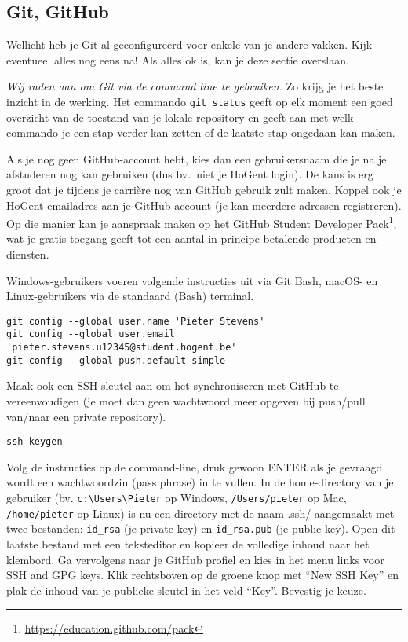 \subsection{Git, GitHub}

Wellicht heb je Git al geconfigureerd voor enkele van je andere vakken. Kijk eventueel alles nog eens na! Als alles ok is, kan je deze sectie overslaan.

\emph{Wij raden aan om Git via de command line te gebruiken.} Zo krijg je het beste inzicht in de werking. Het commando \texttt{git status} geeft op elk moment een goed overzicht van de toestand van je lokale repository en geeft aan met welk commando je een stap verder kan zetten of de laatste stap ongedaan kan maken.

Als je nog geen GitHub-account hebt, kies dan een gebruikersnaam die je na je afstuderen nog kan gebruiken (dus bv.~niet je HoGent login). De kans is erg groot dat je tijdens je carrière nog van GitHub gebruik zult maken. Koppel ook je HoGent-emailadres aan je GitHub account (je kan meerdere adressen registreren). Op die manier kan je aanspraak maken op het GitHub Student Developer Pack\footnote{\url{https://education.github.com/pack}}, wat je gratis toegang geeft tot een aantal in principe betalende producten en diensten.

Windows-gebruikers voeren volgende instructies uit via Git Bash, macOS- en Linux-gebruikers via de standaard (Bash) terminal.

\begin{verbatim}
git config --global user.name 'Pieter Stevens'
git config --global user.email 'pieter.stevens.u12345@student.hogent.be'
git config --global push.default simple
\end{verbatim}

Maak ook een SSH-sleutel aan om het synchroniseren met GitHub te vereenvoudigen (je moet dan geen wachtwoord meer opgeven bij push/pull van/naar een private repository).

\begin{verbatim}
ssh-keygen
\end{verbatim}

Volg de instructies op de command-line, druk gewoon ENTER als je gevraagd wordt een wachtwoordzin (pass phrase) in te vullen. In de home-directory van je gebruiker (bv. \verb|c:\Users\Pieter| op Windows, \verb|/Users/pieter| op Mac, \verb|/home/pieter| op Linux) is nu een directory met de naam .ssh/ aangemaakt met twee bestanden: \verb|id_rsa| (je private key) en \verb|id_rsa.pub| (je public key). Open dit laatste bestand met een teksteditor en kopieer de volledige inhoud naar het klembord. Ga vervolgens naar je GitHub profiel en kies in het menu links voor SSH and GPG keys. Klik rechtsboven op de groene knop met ``New SSH Key'' en plak de inhoud van je publieke sleutel in het veld ``Key''. Bevestig je keuze.

